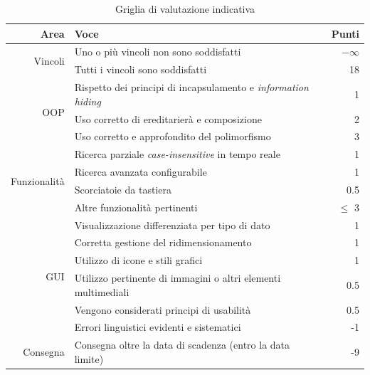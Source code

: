 \documentclass[10pt,a4paper,oneside]{article}
\begin{document}
\begin{table}[ht]
 \caption{Griglia di valutazione indicativa}
 \begin{tabularx}{\linewidth}{r X r}
  \textbf{Area} & \textbf{Voce} & \textbf{Punti} \\
  \toprule
  \multirow{2}{*}{Vincoli} & Uno o più vincoli non sono soddisfatti & $-\infty$ \\
  \addlinespace
  & Tutti i vincoli sono soddisfatti       & 18 \\
		
  \midrule
  \multirow{3}{*}{OOP} & Rispetto dei principi di incapsulamento e \emph{information hiding} & 1 \\
  \addlinespace
  & Uso corretto di ereditarierà e composizione & 2 \\
  \addlinespace
  & Uso corretto e approfondito del polimorfismo               & 3 \\

  \midrule
  \multirow{4}{*}{Funzionalità} & Ricerca parziale \emph{case-insensitive} in tempo reale &   1 \\
  \addlinespace
  & Ricerca avanzata configurabile &   1 \\
  \addlinespace
  & Scorciatoie da tastiera        & 0.5 \\
  \addlinespace
  & Altre funzionalità pertinenti  & $\leq$ 3 \\

  \midrule
  \multirow{6}{*}{GUI} & Visualizzazione differenziata per tipo di dato &   1 \\
  \addlinespace
  & Corretta gestione del ridimensionamento          &   1 \\
  \addlinespace
  & Utilizzo di icone e stili grafici                &   1 \\
  \addlinespace
  & Utilizzo pertinente di immagini o altri elementi multimediali & 0.5 \\
  \addlinespace
  & Vengono considerati principi di usabilità        & 0.5 \\
  
  \midrule
  Relazione & Errori linguistici evidenti e sistematici & -1 \\
  
  \midrule
  Consegna & Consegna oltre la data di scadenza (entro la data limite)& -9 \\
  \bottomrule
 \end{tabularx}
\label{tab:evaluation}
\end{table}
\end{document}
